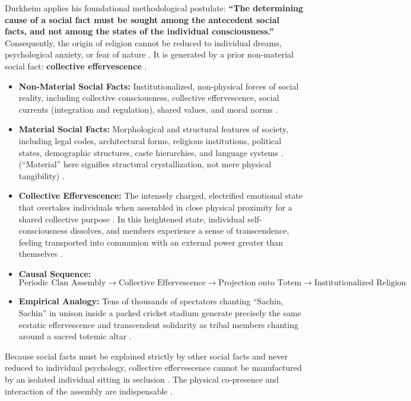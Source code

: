 Durkheim applies his foundational methodological postulate: \textbf{``The determining cause of a social fact must be sought among the antecedent social facts, and not among the states of the individual consciousness.''}  Consequently, the origin of religion cannot be reduced to individual dreams, psychological anxiety, or fear of nature . It is generated by a prior non-material social fact: \textbf{collective effervescence} .

\begin{itemize}
    \item \textbf{Non-Material Social Facts:} Institutionalized, non-physical forces of social reality, including collective consciousness, collective effervescence, social currents (integration and regulation), shared values, and moral norms .
    \item \textbf{Material Social Facts:} Morphological and structural features of society, including legal codes, architectural forms, religious institutions, political states, demographic structures, caste hierarchies, and language systems . (``Material'' here signifies structural crystallization, not mere physical tangibility) .
\end{itemize}

\begin{KeyConcept}
\begin{itemize}
    \item \textbf{Collective Effervescence:} The intensely charged, electrified emotional state that overtakes individuals when assembled in close physical proximity for a shared collective purpose . In this heightened state, individual self-consciousness dissolves, and members experience a sense of transcendence, feeling transported into communion with an external power greater than themselves .
    \item \textbf{Causal Sequence:}
    $$\text{Periodic Clan Assembly} \longrightarrow \text{Collective Effervescence} \longrightarrow \text{Projection onto Totem} \longrightarrow \text{Institutionalized Religion}$$ 
    \item \textbf{Empirical Analogy:} Tens of thousands of spectators chanting ``Sachin, Sachin'' in unison inside a packed cricket stadium generate precisely the same ecstatic effervescence and transcendent solidarity as tribal members chanting around a sacred totemic altar .
\end{itemize}
\end{KeyConcept}

\begin{CriticalPoint}
Because social facts must be explained strictly by other social facts and never reduced to individual psychology, collective effervescence cannot be manufactured by an isolated individual sitting in seclusion . The physical co-presence and interaction of the assembly are indispensable .
\end{CriticalPoint}

